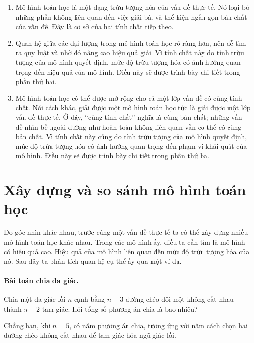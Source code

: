 \documentclass[11pt]{article}
\begin{document}
\begin{enumerate}
  \item {} Mô hình toán học là một dạng trừu tượng hóa
  của vấn đề thực tế. Nó loại bỏ những phần không liên quan đến việc giải bài
  và thể hiện ngắn gọn bản chất của vấn đề. Đây là cơ sở của hai tính chất
  tiếp theo.

  \item {} Quan hệ giữa các đại lượng trong mô hình toán
  học rõ ràng hơn, nên dễ tìm ra quy luật và nhờ đó nâng cao hiệu quả giải.
  Vì tính chất này do tính trừu tượng của mô hình quyết định, mức độ trừu
  tượng hóa có ảnh hưởng quan trọng đến hiệu quả của mô hình. Điều này sẽ
  được trình bày chi tiết trong phần thứ hai.

  \item {} Mô hình toán học có thể được mở rộng cho cả
  một lớp vấn đề có cùng tính chất. Nói cách khác, giải được một mô hình toán
  học tức là giải được một lớp vấn đề thực tế. Ở đây, ``cùng tính chất'' nghĩa
  là cùng bản chất; những vấn đề nhìn bề ngoài dường như hoàn toàn không liên
  quan vẫn có thể có cùng bản chất. Vì tính chất này cũng do tính trừu tượng
  của mô hình quyết định, mức độ trừu tượng hóa có ảnh hưởng quan trọng đến
  phạm vi khái quát của mô hình. Điều này sẽ được trình bày chi tiết trong
  phần thứ ba.
\end{enumerate}

\section{Xây dựng và so sánh mô hình toán học}

Do góc nhìn khác nhau, trước cùng một vấn đề thực tế ta có thể xây dựng nhiều
mô hình toán học khác nhau. Trong các mô hình ấy, điều ta cần tìm là mô hình
có hiệu quả cao. Hiệu quả của mô hình liên quan đến mức độ trừu tượng hóa của
nó. Sau đây ta phân tích quan hệ cụ thể ấy qua một ví dụ.

\paragraph{Bài toán chia đa giác.}
Chia một đa giác lồi \(n\) cạnh bằng \(n-3\) đường chéo đôi một không cắt nhau
thành \(n-2\) tam giác. Hỏi tổng số phương án chia là bao nhiêu?

Chẳng hạn, khi \(n=5\), có năm phương án chia, tương ứng với năm cách chọn hai
đường chéo không cắt nhau để tam giác hóa ngũ giác lồi.
\end{document}
